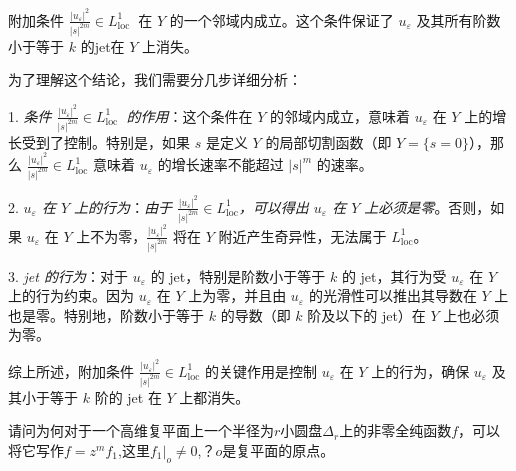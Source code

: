 \documentclass[lang=cn,12pt,a4paper,fontset=none]{beautybook}
\begin{document}
附加条件 $\frac{\left|u_{\varepsilon}\right|^2}{ |s|^{2m}} \in L_{\text {loc }}^1$ 在 $Y$ 的一个邻域内成立。这个条件保证了 $u_{\varepsilon}$ 及其所有阶数小于等于 $k$ 的jet在 $Y$ 上消失。

为了理解这个结论，我们需要分几步详细分析：


1.  \textit{条件 $\frac{\left|u_{\varepsilon}\right|^2}{ |s|^{2m}} \in L_{\text {loc }}^1$ 的作用}：这个条件在 $Y$ 的邻域内成立，意味着 $u_{\varepsilon}$ 在 $Y$ 上的增长受到了控制。特别是，如果 $s$ 是定义 $Y$ 的局部切割函数（即 $Y = \{s = 0\}$），那么 $\frac{\left|u_{\varepsilon}\right|^2}{ |s|^{2m}} \in L_{\text{loc}}^1$ 意味着 $u_{\varepsilon}$ 的增长速率不能超过 $|s|^m$ 的速率。

2.  \textit{$u_{\varepsilon}$ 在 $Y$ 上的行为}：\textit{由于 $\frac{\left|u_{\varepsilon}\right|^2}{ |s|^{2m}} \in L_{\text{loc}}^1$，可以得出 $u_{\varepsilon}$ 在 $Y$ 上必须是零}。否则，如果 $u_{\varepsilon}$ 在 $Y$ 上不为零，$\frac{\left|u_{\varepsilon}\right|^2}{ |s|^{2m}}$ 将在 $Y$ 附近产生奇异性，无法属于 $L_{\text{loc}}^1$。

3.  \textit{jet 的行为}：对于 $u_{\varepsilon}$ 的 jet，特别是阶数小于等于 $k$ 的 jet，其行为受 $u_{\varepsilon}$ 在 $Y$ 上的行为约束。因为 $u_{\varepsilon}$ 在 $Y$ 上为零，并且由 $u_{\varepsilon}$ 的光滑性可以推出其导数在 $Y$ 上也是零。特别地，阶数小于等于 $k$ 的导数（即 $k$ 阶及以下的 jet）在 $Y$ 上也必须为零。

综上所述，附加条件 $\frac{\left|u_{\varepsilon}\right|^2}{ |s|^{2m}} \in L_{\text{loc}}^1$ 的关键作用是控制 $u_{\varepsilon}$ 在 $Y$ 上的行为，确保 $u_{\varepsilon}$ 及其小于等于 $k$ 阶的 jet 在 $Y$ 上都消失。


\begin{problem}[][非零全纯函数的泰勒展开性质]
   请问为何对于一个高维复平面上一个半径为$r$小圆盘$\Delta_r$上的非零全纯函数$f$，可以将它写作$f=z^m f_1$,这里$f_1|_o\neq 0$,？$o$是复平面的原点。
\end{problem}
\end{document}
